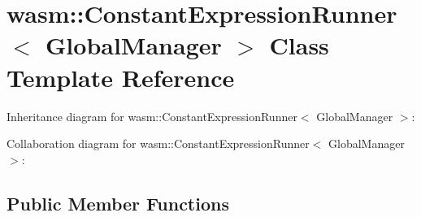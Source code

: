 \hypertarget{classwasm_1_1_constant_expression_runner}{}\section{wasm\+:\+:Constant\+Expression\+Runner$<$ Global\+Manager $>$ Class Template Reference}
\label{classwasm_1_1_constant_expression_runner}


Inheritance diagram for wasm\+:\+:Constant\+Expression\+Runner$<$ Global\+Manager $>$\+:


Collaboration diagram for wasm\+:\+:Constant\+Expression\+Runner$<$ Global\+Manager $>$\+:
\subsection*{Public Member Functions}
